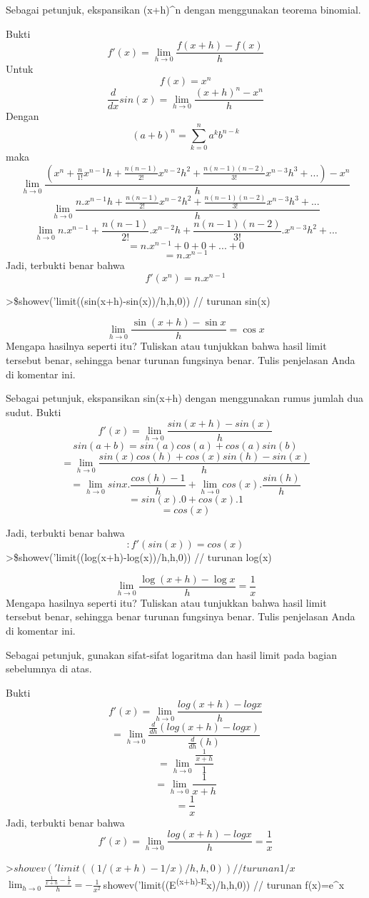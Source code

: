 \documentclass[
]{book}
\begin{document}
Sebagai petunjuk, ekspansikan (x+h)\^{}n dengan menggunakan teorema binomial.

Bukti \[f'(x) = \lim_{h\to 0} \frac{f(x+h)-f(x)}{h}\] Untuk \[f(x)=x^{n}\] \[\frac{d}{dx}sin(x) = \lim_{h\to 0} \frac{(x+h)^{n}-x^{n}}{h}\] Dengan \[(a+b)^{n}=\sum_{k=0}^n a^{k}b^{n-k}\] maka \[\lim_{h\to 0} \frac{(x^{n}+\frac{n}{1!}x^{n-1}h+\frac{n(n-1)}{2!}x^{n-2}h^2+\frac{n(n-1)(n-2)}{3!}x^{n-3}h^{3}+...)-x^{n}}{h}\] \[\lim_{h\to 0} \frac{n.x^{n-1}h+\frac{n(n-1)}{2!}x^{n-2}h^2+\frac{n(n-1)(n-2)}{3!}x^{n-3}h^{3}+...}{h}\] \[\lim_{h\to 0} n.x^{n-1}+\frac{n(n-1)}{2!}.x^{n-2}h+\frac{n(n-1)(n-2)}{3!}.x^{n-3}h^{2}+...\] \[=n.x^{n-1}+0+0+...+0\] \[= n.x^{n-1}\] Jadi, terbukti benar bahwa \[f'(x^n) = n.x^{n-1}\]

\textgreater\$showev('limit((sin(x+h)-sin(x))/h,h,0)) // turunan sin(x)

\[\lim_{h\rightarrow 0}{\frac{\sin \left(x+h\right)-\sin x}{h}}=\cos x\] Mengapa hasilnya seperti itu? Tuliskan atau tunjukkan bahwa hasil limit tersebut benar, sehingga benar turunan fungsinya benar. Tulis penjelasan Anda di komentar ini.

Sebagai petunjuk, ekspansikan sin(x+h) dengan menggunakan rumus jumlah dua sudut. Bukti \[f'(x) = \lim_{h\to 0} \frac{sin(x+h)-sin(x)}{h}\] \[sin(a+b)=sin(a)cos(a)+cos(a)sin(b)\] \[= \lim_{h\to 0} \frac{sin(x)cos(h)+cos(x)sin(h)-sin(x)}{h}\] \[= \lim_{h\to 0} sinx.\frac{cos(h)-1}{h}+\lim_{h\to 0} cos(x).\frac{sin(h)}{h}\] \[= sin(x).0+cos(x).1\] \[= cos(x)\]

Jadi, terbukti benar bahwa \[: f'(sin(x)) = cos(x)\] \textgreater\$showev('limit((log(x+h)-log(x))/h,h,0)) // turunan log(x)

\[\lim_{h\rightarrow 0}{\frac{\log \left(x+h\right)-\log x}{h}}=\frac{1}{x}\]Mengapa hasilnya seperti itu? Tuliskan atau tunjukkan bahwa hasil limit tersebut benar, sehingga benar turunan fungsinya benar. Tulis penjelasan Anda di komentar ini.

Sebagai petunjuk, gunakan sifat-sifat logaritma dan hasil limit pada bagian sebelumnya di atas.

Bukti\[f'(x) = \lim_{h\to 0} \frac{log(x+h)-log x}{h}\] \[=\lim_{h\to 0} \frac{\frac{d}{dh}(log(x+h)-log x)}{\frac{d}{dh}(h)}\] \[=\lim_{h\to 0} \frac{\frac{1}{x+h}}{1}\] \[=\lim_{h\to 0} \frac{1}{x+h}\] \[=\frac{1}{x}\] Jadi, terbukti benar bahwa \[f'(x) = \lim_{h\to 0} \frac{log(x+h)-log x}{h} = \frac{1}{x}\]

\textgreater{}\(showev('limit((1/(x+h)-1/x)/h,h,0)) // turunan 1/x\)\(\lim_{h\rightarrow 0}{\frac{\frac{1}{x+h}-\frac{1}{x}}{h}}=-\frac{1}{x^2}\)\(\>\)showev('limit((E\textsuperscript{(x+h)-E}x)/h,h,0)) // turunan f(x)=e\^{}x
\end{document}
